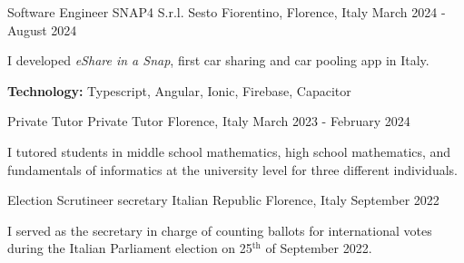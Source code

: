 

\begin{cventries}

  \cventry
    {Software Engineer} %
    {SNAP4 S.r.l.} %
    {Sesto Fiorentino, Florence, Italy} %
    {March 2024 - August 2024} %
    {
      \begin{cvitems} %
        \item {I developed \textit{eShare in a Snap}, first car sharing and car pooling app in Italy.}
        \item {\textbf{Technology:} Typescript, Angular, Ionic, Firebase, Capacitor}
      \end{cvitems}
    }

  \cventry
    {Private Tutor} %
    {Private Tutor} %
    {Florence, Italy} %
    {March 2023 - February 2024} %
    {
      \begin{cvitems} %
        \item {I tutored students in middle school mathematics, high school mathematics, and fundamentals of informatics at the university level for three diﬀerent individuals.}
      \end{cvitems}
    }

  \cventry
    {Election Scrutineer secretary} %
    {Italian Republic} %
    {Florence, Italy} %
    {September 2022} %
    {
      \begin{cvitems} %
        \item {I served as the secretary in charge of counting ballots for international votes during the Italian Parliament election on 25$^{\text{th}}$ of September 2022.}
      \end{cvitems}
    }


\end{cventries}
